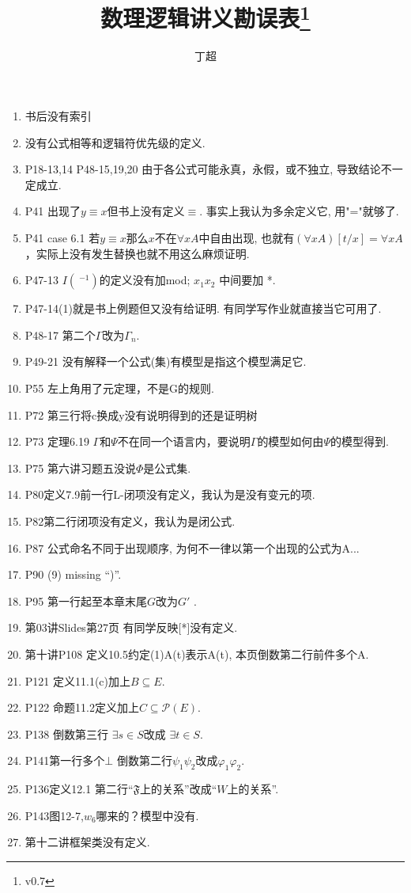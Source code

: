 \documentclass{article}
\begin{document}
\title{数理逻辑讲义勘误表\footnote{v0.7}}
\author{丁超}
\maketitle	
\begin{enumerate}
\item 书后没有索引
\item 没有公式相等和逻辑符优先级的定义. 
\item P18-13,14 P48-15,19,20 由于各公式可能永真，永假，或不独立, 导致结论不一定成立. 
\item P41 出现了$y\equiv x$但书上没有定义$\equiv$. 事实上我认为多余定义它, 用"="就够了. 
\item P41 case 6.1 若$y\equiv x$那么$x$不在$\forall xA$中自由出现, 也就有$(\forall xA)[t/x] = \forall xA$，实际上没有发生替换也就不用这么麻烦证明. 
\item P47-13 $I(~^{-1})$的定义没有加mod; $x_1x_2$ 中间要加 *. 
\item P47-14(1)就是书上例题但又没有给证明. 有同学写作业就直接当它可用了. 
\item P48-17 第二个$\Gamma$改为$\Gamma_n$. 
\item P49-21 没有解释一个公式(集)有模型是指这个模型满足它. 
\item P55 左上角用了元定理，不是G的规则. 
\item P72 第三行将c换成y没有说明得到的还是证明树
\item P73 定理6.19 $\Gamma$和$\Psi$不在同一个语言内，要说明$\Gamma$的模型如何由$\Psi$的模型得到. 
\item P75 第六讲习题五没说$\Phi$是公式集. 
\item P80定义7.9前一行L-闭项没有定义，我认为是没有变元的项. 
\item P82第二行闭项没有定义，我认为是闭公式. 
\item P87 公式命名不同于出现顺序, 为何不一律以第一个出现的公式为A...
\item P90 (9) missing ``)''. 
\item P95 第一行起至本章末尾$G$改为$G'$ . 
\item 第03讲Slides第27页 有同学反映[*]没有定义. 
\item 第十讲P108 定义10.5约定(1)A(t)表示A(t), 本页倒数第二行前件多个A. 
\item P121 定义11.1(c)加上$B\subseteq E$. 
\item P122 命题11.2定义加上$C\subseteq \mathcal{P}(E)$. 
\item P138 倒数第三行 $\exists s \in S$改成 $\exists t \in S$. 
\item P141第一行多个$\bot$ 倒数第二行$\psi_1 \psi_2$改成$\varphi_1 \varphi_2$. 
\item P136定义12.1 第二行``$\mathfrak{F}$上的关系''改成``$W$上的关系''. 
\item P143图12-7,$w_6$哪来的？模型中没有. 
\item 第十二讲框架类没有定义. 



\end{enumerate}
\end{document}
